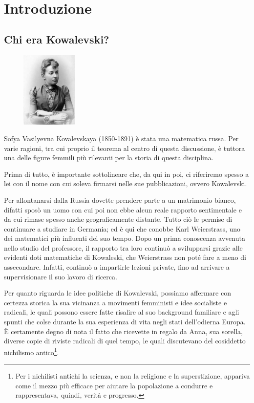 \chapter{Introduzione}

\section{Chi era Kowalevski?}
\begin{figure}
    \centering
    \includegraphics[width=0.25\textwidth]{kovalevskaya_8}
\end{figure}

Sofya Vasilyevna Kovalevskaya (1850-1891) è stata una matematica russa. Per varie ragioni, tra cui proprio il teorema al centro di questa discussione, è tuttora una delle figure femmili più rilevanti per la storia di questa disciplina.

Prima di tutto, è importante sottolineare che, da qui in poi, ci riferiremo spesso a lei con il nome con cui soleva firmarsi nelle sue pubblicazioni, ovvero Kowalevski.

Per allontanarsi dalla Russia dovette prendere parte a un matrimonio bianco, difatti sposò un uomo con cui poi non ebbe alcun reale rapporto sentimentale e da cui rimase spesso anche geograficamente distante.
Tutto ciò le permise di continuare a studiare in Germania; ed è qui che conobbe Karl Weierstrass, uno dei matematici più influenti del suo tempo.
Dopo un prima conoscenza avvenuta nello studio del professore, il rapporto tra loro continuò a svilupparsi grazie alle evidenti doti matematiche di Kowaleski, che Weierstrass non poté fare a meno di assecondare. Infatti, continuò a impartirle lezioni private, fino ad arrivare a supervisionare il suo lavoro di ricerca.

Per quanto riguarda le idee politiche di Kowalevski, possiamo affermare con certezza storica la sua vicinanza a movimenti femministi e idee socialiste e radicali, le quali possono essere fatte risalire al suo background familiare e agli spunti che colse durante la sua esperienza di vita negli stati dell'odierna Europa. È certamente degno di nota il fatto che ricevette in regalo da Anna, sua sorella, diverse copie di riviste radicali di quel tempo, le quali discutevano del cosiddetto nichilismo antico\footnote{Per i nichilisti antichi la scienza, e non la religione e la superstizione, appariva come il mezzo più efficace per aiutare la popolazione a condurre e rappresentava, quindi, verità e progresso.}.

